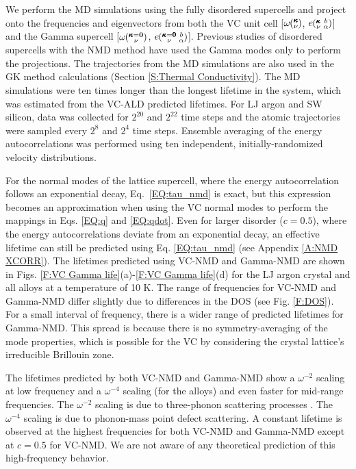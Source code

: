 \documentclass[aps,prb,onecolumn,preprint,footinbib,superscriptaddress,amsmath,amssymb,floatfix]{revtex4}
\newcommand{\kvba}{\mspace{-4.0mu}\left(\mspace{-8.0mu}
\begin{smallmatrix} &\pmb{\kappa} &b \\ &\nu &\alpha\end{smallmatrix}
\mspace{-3.0mu}\right)}
\newcommand{\kgvba}{\mspace{-4.0mu}\left(\mspace{-8.0mu}
\begin{smallmatrix} &\pmb{\kappa}=\pmb{0} &b \\ &\nu 
&\alpha\end{smallmatrix}\mspace{-3.0mu}\right)}
\newcommand{\kv}{\mspace{-4.0mu}\left(\mspace{-8.0mu}
\begin{smallmatrix}&\pmb{\kappa} \\&\nu\end{smallmatrix}
\mspace{-3.0mu}\right)}
\newcommand{\kgv}{\mspace{-4.0mu}\left(\mspace{-8.0mu}
\begin{smallmatrix}&\pmb{\kappa}=\mathbf{0} \\&\nu\end{smallmatrix}
\mspace{-3.0mu}\right)}
\begin{document}
We perform the MD simulations using the fully disordered supercells  
and project onto the frequencies and eigenvectors 
from both the VC unit cell [$\omega\kv$, $e\kvba$] and the 
Gamma supercell [$\omega\kgv$, $e\kgvba$]. Previous studies of 
disordered supercells with the 
NMD method have used the Gamma modes only to perform the projections.
\cite{donadio_atomistic_2009,he_heat_2011,he_morphology_2011,
he_lattice_2012,hori_phonon_2013} 
The trajectories from 
the MD simulations are also used in the GK method calculations
(Section \ref{S:Thermal Conductivity}). 
The MD simulations were ten times longer than the 
longest lifetime in the system, which was  
estimated from the VC-ALD predicted lifetimes. For LJ 
argon and SW silicon, data was collected for $2^{20}$ and 
$2^{22}$ time steps and the atomic trajectories were sampled 
every $2^8$ and $2^4$ time steps. 
Ensemble averaging of the energy autocorrelations was performed 
using ten independent, initially-randomized velocity distributions. 

For the normal modes of the lattice supercell, where the energy 
autocorrelation follows an 
exponential decay,\cite{ladd_lattice_1986,turney_predicting_2009-1} 
Eq.~\eqref{EQ:tau_nmd} is exact, but this expression becomes an 
approximation when 
using the VC normal modes to perform the mappings in Eqs.  
\eqref{EQ:q} and \eqref{EQ:qdot}. 
Even for larger disorder ($c=0.5$),  
where the energy autocorrelations 
deviate from an exponential decay, 
an effective lifetime can still be predicted 
using Eq. \eqref{EQ:tau_nmd} (see Appendix \ref{A:NMD XCORR}). 
The lifetimes predicted using VC-NMD and Gamma-NMD  
are shown in Figs. \ref{F:VC Gamma life}(a)-\ref{F:VC Gamma life}(d) 
for the LJ argon crystal and all alloys at a temperature of 10 K. 
The range of frequencies for 
VC-NMD and Gamma-NMD differ slightly due to differences in 
the DOS (see Fig. \ref{F:DOS}). 
For a small interval of frequency, there is a wider range of 
predicted lifetimes for Gamma-NMD. This spread is because there 
is no symmetry-averaging of the mode properties, 
which is possible for the VC by considering the crystal 
lattice's irreducible Brillouin zone.\cite{ashcroft_solid_1976} 

The lifetimes predicted by both VC-NMD and Gamma-NMD 
show a $\omega^{-2}$ scaling at low frequency and a $\omega^{-4}$ 
scaling (for the alloys) and 
even faster for mid-range frequencies. The $\omega^{-2}$ scaling 
is due to three-phonon scattering processes
\cite{callaway_model_1959,maradudin_scattering_1962}. The 
$\omega^{-4}$ scaling is due to phonon-mass point defect 
scattering.\cite{klemens_scattering_1955,klemens_thermal_1957,mattis_phonon_1957,tamura_isotope_1983} 
A constant lifetime is observed at the highest frequencies  
for both VC-NMD and Gamma-NMD except at $c=0.5$ for VC-NMD. We are not 
aware of any theoretical prediction of this high-frequency behavior.
\end{document}

